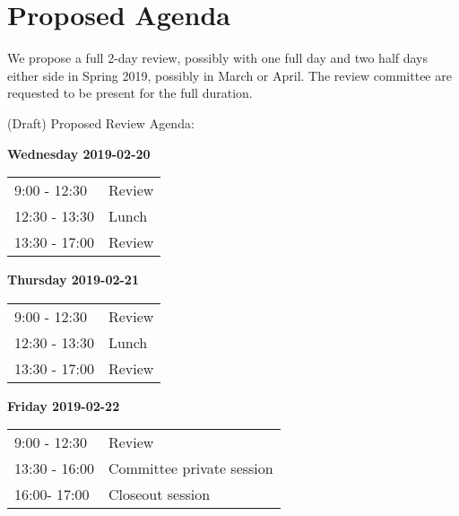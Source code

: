 \documentclass[DM,lsstdraft,STS,toc]{lsstdoc}
\begin{document}
\section{Proposed Agenda} 
We propose a full 2-day review, possibly with one full day and two half days either side in Spring 2019, possibly in March or April.   
The review committee are requested to be present for the full duration.  

(Draft) Proposed Review Agenda:  

\textbf{Wednesday 2019-02-20} \\
\begin{tabular}[htb]{l l}
9:00 - 12:30 & Review \\
12:30 - 13:30 & Lunch \\
13:30 - 17:00 & Review \\
\end{tabular}

\textbf{Thursday 2019-02-21} \\
\begin{tabular}[htb]{l l} 
9:00 - 12:30 & Review \\
12:30 - 13:30 & Lunch \\
13:30 - 17:00 & Review \\
\end{tabular}

\textbf{Friday 2019-02-22} \\
\begin{tabular}[htb]{l l}
9:00 - 12:30 & Review \\
13:30 - 16:00 &Committee private session \\
16:00- 17:00 & Closeout session\\
\end{tabular}
 
\clearpage
\end{document}
